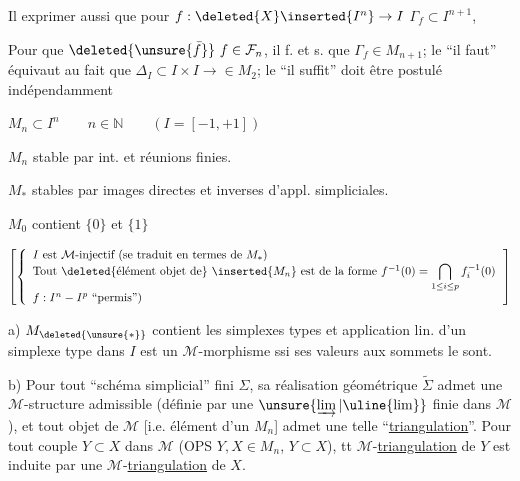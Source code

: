 Il  exprimer aussi que pour  $f:\deleted{X}\inserted{I^n}\to I$    $\Gamma_f\subset I^{n+1}$,

Pour que $\deleted{\unsure{\bar f}}\ f\in\mathcal F_n$, il f. et s. que $\Gamma_f\in M_{n+1}$;
le ``il faut'' équivaut au fait que $\Delta_I\subset I\times I\longrightarrow{}\in M_2$; le ``il suffit'' doit être postulé indépendamment


$M_n\subset I^n\qquad n\in\mathbb N\qquad(I=[-1,+1])$

$M_n$ stable par int. et réunions finies.

$M_*$ stables par images directes et inverses d'appl. simpliciales.

$M_0$ contient  $\{0\}$ et $\{1\}$

$\left[\left\{\begin{array}{l}
I\text{ est }\mathcal M\text{-injectif (se traduit en termes de }M_*\text{)}\\
\text{Tout }\deleted{\text{élément objet de}}\ \inserted{M_n}\text{ est de la forme }
f^{-1}(0)=\displaystyle\bigcap_{1\leq i\leq p}f_i^{-1}(0)\\
f:I^n-I^p\text{ ``permis'')}
\end{array}\right.\right]$
\margin{$\Longrightarrow$}

a) $M_{\deleted{\unsure{*}}}$ contient les simplexes types et   application lin. d'un simplexe type dans $I$ est un $\mathcal M$-morphisme ssi  ses valeurs aux sommets le sont.

b) Pour tout  ``schéma simplicial'' fini $\Sigma$, sa réalisation
géométrique $\widetilde\Sigma$ admet une $\mathcal M$-structure admissible (définie par une $\unsure{\varinjlim|\uline{\lim}}$ finie dans $\mathcal M$), et  tout objet de $\mathcal M$ [i.e.  élément d'un $M_n$] admet une telle ``\uline{triangulation}''.
Pour tout couple $Y\subset X$ dans $\mathcal M$ (OPS $Y,X\in M_n$, $Y\subset X$),  tt  $\mathcal M$-\uline{triangulation} de $Y$ est induite par une $\mathcal M$-\uline{triangulation} de $X$.

